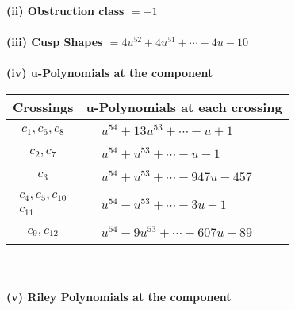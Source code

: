 \documentclass[1p]{elsarticle_modified}
\theoremstyle{definition}
\begin{document}
\flushleft \textbf{(ii) Obstruction class $= -1$}\\~\\
\flushleft \textbf{(iii) Cusp Shapes $= 4 u^{52}+4 u^{51}+\cdots-4 u-10$}\\~\\
\newpage\renewcommand{\arraystretch}{1}
\flushleft \textbf{(iv) u-Polynomials at the component}\newline \\
\begin{tabular}{m{50pt}|m{274pt}}
Crossings & \hspace{64pt}u-Polynomials at each crossing \\
\hline $$\begin{aligned}c_{1},c_{6},c_{8}\end{aligned}$$&$\begin{aligned}
&u^{54}+13 u^{53}+\cdots- u+1
\end{aligned}$\\
\hline $$\begin{aligned}c_{2},c_{7}\end{aligned}$$&$\begin{aligned}
&u^{54}+u^{53}+\cdots- u-1
\end{aligned}$\\
\hline $$\begin{aligned}c_{3}\end{aligned}$$&$\begin{aligned}
&u^{54}+u^{53}+\cdots-947 u-457
\end{aligned}$\\
\hline $$\begin{aligned}c_{4},c_{5},c_{10}\\c_{11}\end{aligned}$$&$\begin{aligned}
&u^{54}- u^{53}+\cdots-3 u-1
\end{aligned}$\\
\hline $$\begin{aligned}c_{9},c_{12}\end{aligned}$$&$\begin{aligned}
&u^{54}-9 u^{53}+\cdots+607 u-89
\end{aligned}$\\
\hline
\end{tabular}\\~\\
\newpage\renewcommand{\arraystretch}{1}
\flushleft \textbf{(v) Riley Polynomials at the component}\newline \\
\end{document}
